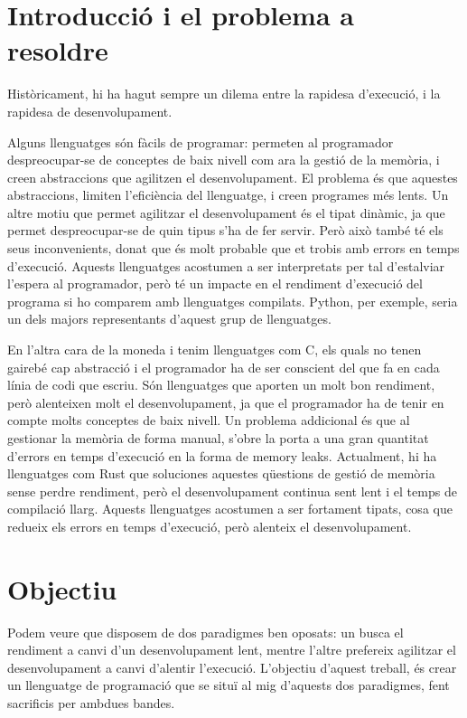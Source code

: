 ﻿\documentclass{article}
\begin{document}
\section{Introducció i el problema a resoldre}
Històricament, hi ha hagut sempre un dilema entre la rapidesa d'execució, i la
rapidesa de desenvolupament.

Alguns llenguatges són fàcils de programar: permeten al programador
despreocupar-se de conceptes de baix nivell com ara la gestió de la memòria,
i creen abstraccions que agilitzen el desenvolupament. El problema és que
aquestes abstraccions, limiten l'eficiència del llenguatge, i creen programes
més lents. Un altre motiu que permet agilitzar el desenvolupament és el tipat
dinàmic, ja que permet despreocupar-se de quin tipus s'ha de fer servir. Però
això també té els seus inconvenients, donat que és molt probable que et trobis amb
errors en temps d'execució. Aquests llenguatges acostumen a ser interpretats
per tal d'estalviar l'espera al programador, però té un impacte en el rendiment 
d'execució del programa si ho comparem amb llenguatges compilats. Python, per 
exemple, seria un dels majors representants d'aquest grup de llenguatges.

En l'altra cara de la moneda i tenim llenguatges com C, els quals no tenen gairebé
cap abstracció i el programador ha de ser conscient del que fa en cada línia de
codi que escriu. Són llenguatges que aporten un molt bon rendiment, però 
alenteixen molt el desenvolupament, ja que el programador ha de tenir en compte 
molts conceptes de baix nivell.
Un problema addicional és que al gestionar la memòria de forma manual, s'obre
la porta a una gran quantitat d'errors en temps d'execució en la forma de
memory leaks. Actualment, hi ha llenguatges com Rust que soluciones aquestes
qüestions de gestió de memòria sense perdre rendiment, però el desenvolupament
continua sent lent i el temps de compilació llarg. Aquests llenguatges acostumen 
a ser fortament tipats, cosa que redueix els errors en temps d'execució, però 
alenteix el desenvolupament.

\section{Objectiu}

Podem veure que disposem de dos paradigmes ben oposats: un busca el rendiment a
canvi d'un desenvolupament lent, mentre l'altre prefereix agilitzar el
desenvolupament a canvi d'alentir l'execució. L'objectiu d'aquest treball,
és crear un llenguatge de programació que se situï al mig d'aquests dos
paradigmes, fent sacrificis per ambdues bandes.
\end{document}
